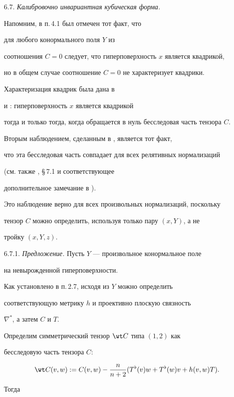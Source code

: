 \medskip



6.7. {\it Калибровочно инвариантная кубическая форма.}

Напомним, в п.\,4.1 был отмечен тот факт, что

для любого конормального поля $Y$ из

соотношения $C=0$ следует, что гиперповерхность $x$ является квадрикой,

но в общем случае соотношение $C=0$ не характеризует квадрики.

Характеризация квадрик была дана в 

\cite{SIM-1} и \cite{NOM-P}: гиперповерхность $x$ является квадрикой

тогда и только тогда, когда обращается в нуль бесследовая часть тензора $C$.

Вторым наблюдением, сделанным в \cite{SIM-2}, является тот факт,

что эта бесследовая часть совпадает для всех релятивных нормализаций

(см. также  \cite{SIM-S-V}, \S\,7.1 и соответствующее

дополнительное замечание в \cite{LI-LIU-S-S-W}).

Это наблюдение верно для всех произвольных нормализаций, поскольку

тензор $C$ можно определить, используя только пару $(x,Y)$, а не

тройку $(x,Y,z)$.

\smallskip



6.7.1. {\it Предложение.} Пусть $Y$ --- произвольное конормальное поле

на невырожденной гиперповерхности.

Как установлено в п.\,2.7, исходя из $Y$ можно определить

соответствующую метрику $h$ и проективно плоскую связность

$\nabla ^*$, а затем $C$ и $T$.

Определим симметрический тензор $\wt C$ типа $(1,2)$ как

бесследовую часть тензора $C$:

$$

\wt C(v,w) := C(v,w) - \frac {n}{n+2}(T^{\flat} (v)w + T^{\flat}(w)v +

h(v,w)T).

$$

Тогда

